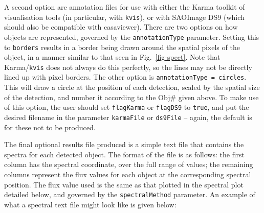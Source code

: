 A second option are annotation files for use with either the Karma
toolkit of visualisation tools (in particular, with \texttt{kvis}), or
with SAOImage DS9 (which should also be compatible with
casaviewer). There are two options on how objects are represented,
governed by the \texttt{annotationType} parameter. Setting this to
\texttt{borders} results in a border being drawn around the spatial
pixels of the object, in a manner similar to that seen in
Fig.~\ref{fig-spect}. Note that Karma/\texttt{kvis} does not always do
this perfectly, so the lines may not be directly lined up with pixel
borders. The other option is \texttt{annotationType = circles}. This
will draw a circle at the position of each detection, scaled by the
spatial size of the detection, and number it according to the Obj\#
given above. To make use of this option, the user should set
\texttt{flagKarma} or \texttt{flagDS9} to \texttt{true}, and put the
desired filename in the parameter \texttt{karmaFile} or
\texttt{ds9File} -- again, the default is for these not to be produced.

\label{sec-spectraltext}

The final optional results file produced is a simple text file that
contains the spectra for each detected object. The format of the file
is as follows: the first column has the spectral coordinate, over the
full range of values; the remaining columns represent the flux values
for each object at the corresponding spectral position. The flux value
used is the same as that plotted in the spectral plot detailed below,
and governed by the \texttt{spectralMethod} parameter. An example of
what a spectral text file might look like is given below:

